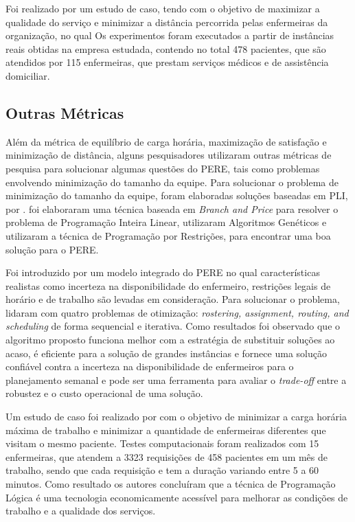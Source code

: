 Foi realizado por  um estudo de caso, tendo com o objetivo de maximizar a qualidade do serviço e minimizar a distância percorrida pelas enfermeiras da organização, no qual Os experimentos foram executados a partir de instâncias reais obtidas na empresa estudada, contendo no total 478 pacientes,  que são atendidos por 115 enfermeiras, que prestam serviços médicos e de assistência domiciliar.
 
\subsection{Outras Métricas}

Além da métrica de equilíbrio de carga horária, maximização de satisfação e minimização de distância, alguns pesquisadores utilizaram outras métricas de pesquisa para solucionar algumas questões do \ac{PERE}, tais como problemas envolvendo minimização do tamanho da equipe. Para solucionar o problema de minimização do tamanho da equipe, foram elaboradas soluções baseadas em \acl{PLI}, por .  foi elaboraram uma técnica baseada em \textit{Branch and Price} para resolver o problema de Programação Inteira Linear,  utilizaram Algoritmos Genéticos e  utilizaram a técnica de Programação por Restrições, para encontrar uma boa solução para o \ac{PERE}.

Foi introduzido por  um modelo integrado do \ac{PERE} no qual características realistas como incerteza na disponibilidade do enfermeiro, restrições legais de horário e de trabalho são levadas em consideração.
Para solucionar o problema,  lidaram com quatro problemas de otimização: \textit{rostering, assignment, routing, and scheduling} de forma sequencial e iterativa. 
Como resultados foi observado que o algoritmo proposto funciona melhor com a estratégia de substituir soluções ao acaso, é eficiente para a solução de grandes instâncias e fornece uma solução confiável contra a incerteza na disponibilidade de enfermeiros para o planejamento semanal e pode ser uma ferramenta para avaliar o \textit{trade-off} entre a robustez e o custo operacional de uma solução.

Um estudo de caso foi realizado por  com o objetivo de minimizar a carga horária máxima de trabalho e minimizar a quantidade de enfermeiras diferentes que visitam o mesmo paciente. Testes computacionais foram realizados com 15 enfermeiras, que atendem a 3323 requisições de 458 pacientes em um mês de trabalho, sendo que cada requisição e tem a duração variando entre 5 a 60 minutos. 
Como resultado os autores concluíram que a técnica de Programação Lógica é uma tecnologia economicamente acessível para melhorar as condições de trabalho e a qualidade dos serviços.

